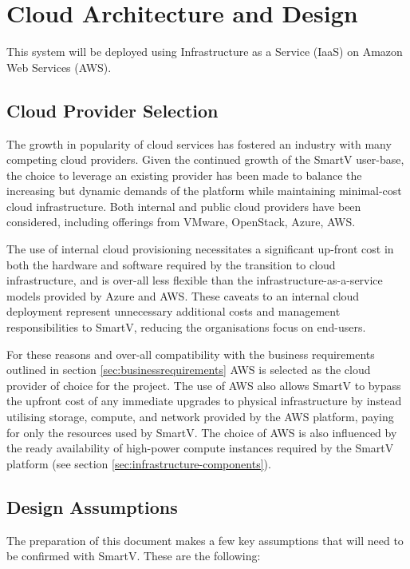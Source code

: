 \section{Cloud Architecture and Design}

This system will be deployed using Infrastructure as a Service (IaaS) on Amazon Web Services (AWS).

\subsection{Cloud Provider Selection}
The growth in popularity of cloud services has fostered an industry with many competing cloud providers. Given the continued growth of the SmartV user-base, the choice to leverage an existing provider has been made to balance the increasing but dynamic demands of the platform while maintaining minimal-cost cloud infrastructure. Both internal and public cloud providers have been considered, including offerings from VMware, OpenStack, Azure, AWS.

The use of internal cloud provisioning necessitates a significant up-front cost in both the hardware and software required by the transition to cloud infrastructure, and is over-all less flexible than the infrastructure-as-a-service models provided by Azure and AWS. These caveats to an internal cloud deployment represent unnecessary additional costs and management responsibilities to SmartV, reducing the organisations focus on end-users.

For these reasons and over-all compatibility with the business requirements outlined in section \ref{sec:businessrequirements} AWS is selected as the cloud provider of choice for the project. The use of AWS also allows SmartV to bypass the upfront cost of any immediate upgrades to physical infrastructure by instead utilising storage, compute, and network provided by the AWS platform, paying for only the resources used by SmartV. The choice of AWS is also influenced by the ready availability of high-power compute instances required by the SmartV platform (see section \ref{sec:infrastructure-components}).

\subsection{Design Assumptions}\label{sec:designassumptions}

The preparation of this document makes a few key assumptions that will need to be confirmed with SmartV. These are the following: 


